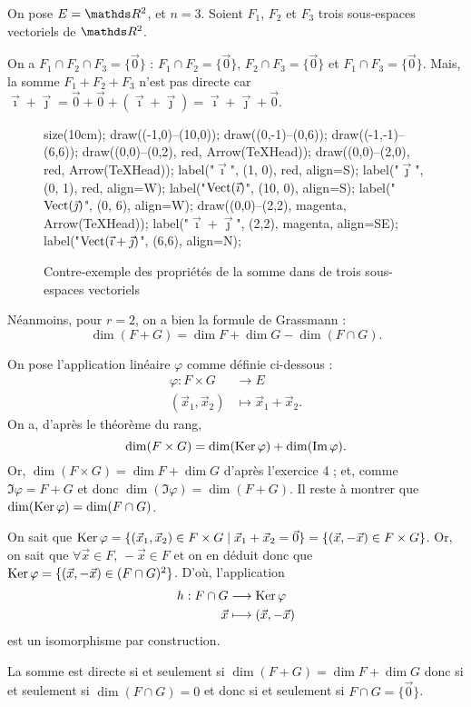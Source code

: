 \begin{exo}
	On pose $E = \R^2$, et $n = 3$. Soient $F_1$, $F_2$\/ et $F_3$\/ trois sous-espaces vectoriels de $\R^2$.

	On a $F_1 \cap F_2 \cap F_3 = \{\vec{0}\}$\/ : $F_1 \cap F_2 = \{\vec{0}\}$, $F_2 \cap F_3 = \{\vec{0}\}$\/ et $F_1 \cap F_3 = \{\vec{0}\}$. Mais, la somme $F_1 + F_2 + F_3$\/ n'est pas directe car $\vec\imath + \vec\jmath = \vec{0} + \vec{0} + (\vec\imath + \vec\jmath) = \vec\imath + \vec\jmath + \vec{0}$.
	\begin{figure}[H]
		\centering
		\begin{asy}
			size(10cm);
			draw((-1,0)--(10,0));
			draw((0,-1)--(0,6));
			draw((-1,-1)--(6,6));
			draw((0,0)--(0,2), red, Arrow(TeXHead));
			draw((0,0)--(2,0), red, Arrow(TeXHead));
			label("$\vec\imath$", (1, 0), red, align=S);
			label("$\vec\jmath$", (0, 1), red, align=W);
			label("$\operatorname{Vect}(\vec\imath)$", (10, 0), align=S);
			label("$\operatorname{Vect}(\vec\jmath)$", (0, 6), align=W);
			draw((0,0)--(2,2), magenta, Arrow(TeXHead));
			label("$\vec\imath + \vec\jmath$", (2,2), magenta, align=SE);
			label("$\operatorname{Vect}(\vec\imath + \vec\jmath)$", (6,6), align=N);
		\end{asy}
		\caption{Contre-exemple des propriétés de la somme dans de trois sous-espaces vectoriels}
	\end{figure}

	Néanmoins, pour $r = 2$, on a bien la formule de {\sc Grassmann}\/ : \[
		\dim(F + G) = \dim F + \dim G - \dim(F \cap G)
	.\]

	\bigskip

	On pose l'application linéaire $\varphi$\/ comme définie ci-dessous :
	\begin{align*}
		\varphi: F\times G &\longrightarrow E \\
		(\vec{x}_1,\vec{x}_2) &\longmapsto \vec{x}_1 + \vec{x}_2.
	\end{align*}
	On a, d'après le théorème du rang, \[
		\dim(F \times G) = \dim(\operatorname{Ker} \varphi) + \dim(\operatorname{Im} \varphi)
	.\] Or, $\dim(F \times G) = \dim F + \dim G$\/ d'après l'{\sc exercice 4}\/ ; et, comme $\Im \varphi = F + G$\/ et donc $\dim(\Im \varphi) = \dim(F + G)$.
	Il reste à montrer que $\dim(\operatorname{Ker} \varphi) = \dim(F \cap G)$.

	On sait que $\operatorname{Ker} \varphi = \{(\vec{x}_1,\vec{x}_2) \in F \times G \mid \vec{x}_1 + \vec{x}_2 = \vec{0}\} = \{(\vec{x},-\vec{x}) \in F \times G\}$. Or, on sait que $\forall \vec{x} \in F,\,-\vec{x} \in F$\/ et on en déduit donc que $\operatorname{Ker} \varphi = \{ (\vec{x},-\vec{x}) \in (F \cap G)^2\}$.
	D'où, l'application \begin{align*}
		h: F \cap G &\longrightarrow \operatorname{Ker} \varphi \\
		\vec{x} &\longmapsto (\vec{x},-\vec{x})
	\end{align*}
	est un isomorphisme par construction.

	La somme est directe si et seulement si $\dim(F+G) = \dim F + \dim G$\/ donc si et seulement si $\dim(F \cap G) = 0$\/ et donc si et seulement si $F \cap G = \{\vec{0}\}$.
\end{exo}

